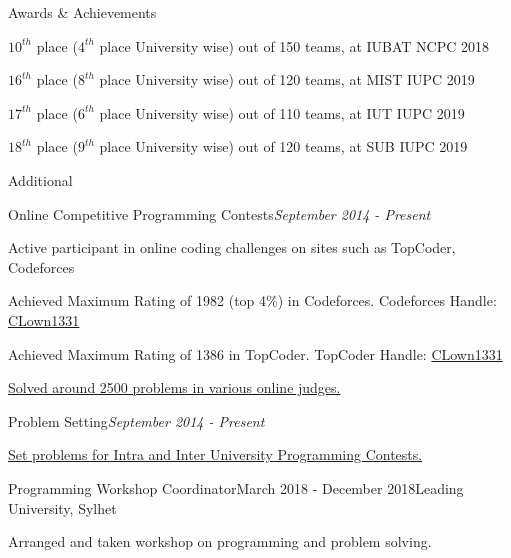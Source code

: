 \documentclass{resume}
\begin{document}

\begin{rSection}{Awards \& Achievements} 

\item $10^{th}$ place ($4^{th}$ place University wise) out of 150 teams, at IUBAT NCPC 2018
\item $16^{th}$ place ($8^{th}$ place University wise) out of 120 teams, at MIST IUPC 2019
\item $17^{th}$ place ($6^{th}$ place University wise) out of 110 teams, at IUT IUPC 2019
\item $18^{th}$ place ($9^{th}$ place University wise) out of 120 teams, at SUB IUPC 2019

\end{rSection}


\begin{rSection}{Additional} 

\begin{rSubsection}{Online Competitive Programming Contests}{\em September 2014 - Present}{}{}{}
\item Active participant in online coding challenges on sites such as TopCoder, Codeforces
\item Achieved Maximum Rating of 1982 (top 4\%) in Codeforces.  Codeforces Handle: \href{http://codeforces.com/profile/CLown1331}{CLown1331}
\item Achieved Maximum Rating of 1386 in TopCoder. TopCoder Handle: \href{https://www.topcoder.com/members/CLown1331/}{CLown1331}
\item \href{https://www.stopstalk.com/user/profile/clown1331}{Solved around 2500 problems in various online judges.}
\end{rSubsection}

\begin{rSubsection}{Problem Setting}{\em September 2014 - Present}{}{}{}
\item \href{https://toph.co/u/CLown1331/problems}{Set problems for Intra and Inter University Programming Contests.}
\end{rSubsection}

\begin{rSubsection}{Programming Workshop Coordinator}{March 2018 - December 2018}{Leading University, Sylhet}{}
\item Arranged and taken workshop on programming and problem solving.
\end{rSubsection}

\end{rSection}
\end{document}
